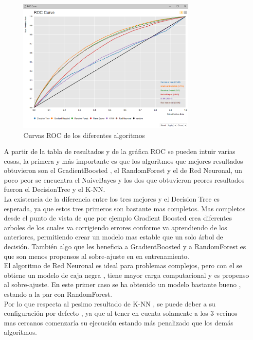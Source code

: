 	\begin{figure}[htb]
		\centering
		\includegraphics[width=0.8\textwidth]{./imagenes/32}
		\caption{Curvas ROC de los diferentes algoritmos} \label{fig:1}
	\end{figure}

	A partir de la tabla de resultados y de la gráfica ROC se pueden intuir varias cosas, la primera y más importante 
	es que los algoritmos que mejores resultados obtuvieron son el GradientBoosted , el RandomForest y el de Red Neuronal, 
	un poco peor se encuentra el NaiveBayes y los dos que obtuvieron peores resultados fueron el DecisionTree y el K-NN. \\

	La existencia de la diferencia entre los tres mejores y el Decision Tree es esperada, ya que estos tres primeros son 
	bastante mas completos. Mas completos desde el punto de vista de que por ejemplo Gradient Boosted crea diferentes arboles
	de los cuales va corrigiendo errores conforme va aprendiendo de los anteriores, permitiendo crear un modelo mas estable 
	que un solo árbol de decisión. También algo que les beneficia a GradientBoosted y a RandomForest es que son menos propensos 
	al sobre-ajuste en en entrenamiento.  \\

	El algoritmo de Red Neuronal es ideal para problemas complejos, pero con el se obtiene un modelo de caja negra , tiene mayor carga computacional
	y es propenso al sobre-ajuste. En este primer caso se ha obtenido un modelo bastante bueno , estando a la par con RandomForest. \\

	Por lo que respecta al pesimo resultado de K-NN , se puede deber a su configuración por defecto , ya que al tener en cuenta solamente a los 3 vecinos mas cercanos
	comenzaría su ejecución estando más penalizado que los demás algoritmos. \\

